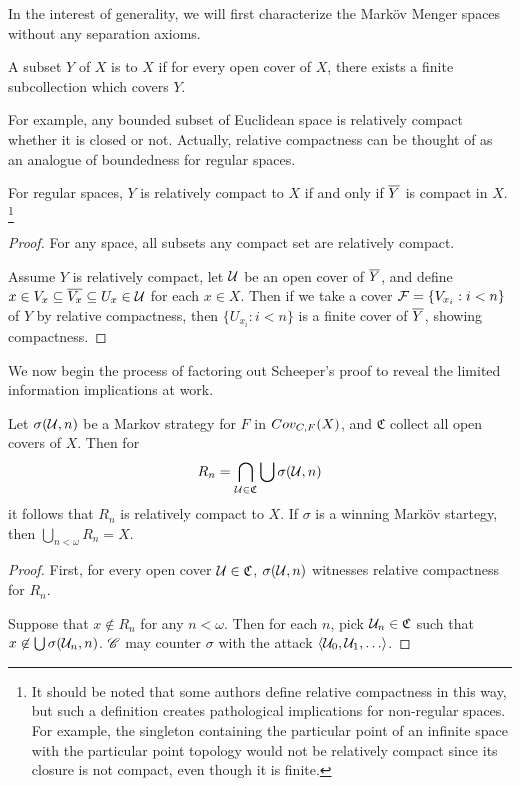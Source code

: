 In the interest of generality, we will first characterize the Mark\"ov Menger
spaces without any separation axioms.

\begin{defn}
  A subset $Y$ of $X$ is  to $X$ if for every open
  cover of $X$, there exists a finite subcollection which covers $Y$.
\end{defn}

For example, any bounded subset of Euclidean space is relatively compact
whether it is closed or not. Actually, relative compactness can be thought
of as an analogue of boundedness for regular spaces.

\begin{prop}
  For regular spaces, $Y$ is relatively compact to $X$ if and only if
  $\overline{Y}$ is compact in $X$.
  \footnote{
    It should be noted that some authors define relative compactness in
    this way, but such a definition creates pathological implications for
    non-regular spaces. For example, the singleton containing
    the particular point of an infinite space with the particular point topology
    would not be relatively compact since its closure is not compact, even
    though it is finite.
  }
\end{prop}

\begin{proof}
  For any space, all subsets any compact set are relatively compact.

  Assume $Y$ is relatively compact, let $\mathcal{U}$ be an open cover of $\overline{Y}$,
  and define $x\in V_x\subseteq \overline{V_x}\subseteq U_x \in \mathcal{U}$ for each
  $x\in X$. Then if we take a cover $\mathcal{F} = \{V_{x_i} : i<n\}$ of $Y$ by
  relative compactness, then $\{U_{x_i}:i<n\}$ is a finite cover of $\overline{Y}$,
  showing compactness.
\end{proof}

We now begin the process of factoring out Scheeper's proof to reveal the
limited information implications at work.

\begin{lem}
  Let $\sigma(\mathcal{U}, n)$ be a Markov strategy for $F$ in
  $Cov_{C,F}(X)$, and $\mathfrak{C}$ collect all open covers of $X$. Then for
    \[
      R_n = \bigcap_{\mathcal{U}\in\mathfrak{C}} \bigcup\sigma(\mathcal{U},n)
    \]
  it follows that $R_n$ is relatively compact to $X$. If $\sigma$ is a winning
  Mark\"ov startegy, then $\bigcup_{n<\omega} R_n = X$.
\end{lem}

\begin{proof}
  First, for every open cover $\mathcal{U}\in\mathfrak C$, $\sigma(\mathcal{U},n)$
  witnesses relative compactness for $R_n$.

  Suppose that $x \not\in R_n$ for any $n<\omega$. Then for each $n$,
  pick $\mathcal{U}_n\in\mathfrak{C}$ such that $x\not\in \bigcup\sigma(\mathcal{U}_n,n)$.
  $\mathscr{C}$ may counter $\sigma$ with the attack $\<\mc U_0,\mc U_1,\dots\>$.
\end{proof}

